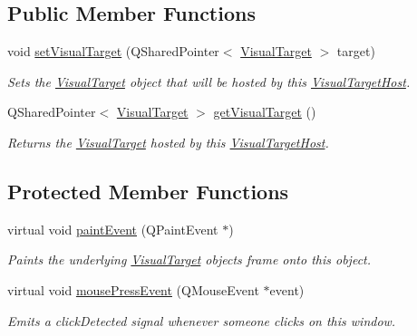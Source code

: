 \subsection*{Public Member Functions}
\begin{DoxyCompactItemize}
\item 
\hypertarget{class_picto_1_1_visual_target_host_a41d34ca0cff45eddfb8b164407bff116}{void \hyperlink{class_picto_1_1_visual_target_host_a41d34ca0cff45eddfb8b164407bff116}{set\-Visual\-Target} (Q\-Shared\-Pointer$<$ \hyperlink{class_picto_1_1_visual_target}{Visual\-Target} $>$ target)}\label{class_picto_1_1_visual_target_host_a41d34ca0cff45eddfb8b164407bff116}

\begin{DoxyCompactList}\small\item\em Sets the \hyperlink{class_picto_1_1_visual_target}{Visual\-Target} object that will be hosted by this \hyperlink{class_picto_1_1_visual_target_host}{Visual\-Target\-Host}. \end{DoxyCompactList}\item 
\hypertarget{class_picto_1_1_visual_target_host_a375c688433f74774ea9664fbe62b147d}{Q\-Shared\-Pointer$<$ \hyperlink{class_picto_1_1_visual_target}{Visual\-Target} $>$ \hyperlink{class_picto_1_1_visual_target_host_a375c688433f74774ea9664fbe62b147d}{get\-Visual\-Target} ()}\label{class_picto_1_1_visual_target_host_a375c688433f74774ea9664fbe62b147d}

\begin{DoxyCompactList}\small\item\em Returns the \hyperlink{class_picto_1_1_visual_target}{Visual\-Target} hosted by this \hyperlink{class_picto_1_1_visual_target_host}{Visual\-Target\-Host}. \end{DoxyCompactList}\end{DoxyCompactItemize}
\subsection*{Protected Member Functions}
\begin{DoxyCompactItemize}
\item 
virtual void \hyperlink{class_picto_1_1_visual_target_host_adee5a34fd8bd737e71f17d47ff97d3fd}{paint\-Event} (Q\-Paint\-Event $\ast$)
\begin{DoxyCompactList}\small\item\em Paints the underlying \hyperlink{class_picto_1_1_visual_target}{Visual\-Target} objects frame onto this object. \end{DoxyCompactList}\item 
\hypertarget{class_picto_1_1_visual_target_host_ac7259d491789462b787cfad331b4bcef}{virtual void \hyperlink{class_picto_1_1_visual_target_host_ac7259d491789462b787cfad331b4bcef}{mouse\-Press\-Event} (Q\-Mouse\-Event $\ast$event)}\label{class_picto_1_1_visual_target_host_ac7259d491789462b787cfad331b4bcef}

\begin{DoxyCompactList}\small\item\em Emits a click\-Detected signal whenever someone clicks on this window. \end{DoxyCompactList}\end{DoxyCompactItemize}


